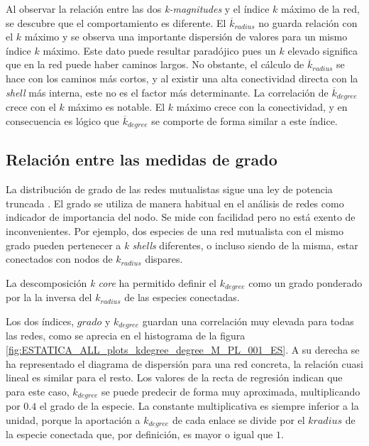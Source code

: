 Al observar la relación entre las dos \textit{k-magnitudes} y el índice $k$ máximo de la red, se descubre que el comportamiento es diferente. El $\overline{k}_{radius}$ no guarda relación con el $k$ máximo y se observa una importante dispersión de valores para un mismo índice $k$ máximo. Este dato puede resultar paradójico pues un $k$ elevado significa que en la red puede haber caminos largos. No obstante, el cálculo de $\overline{k}_{radius}$ se hace con los caminos más cortos, y al existir una alta conectividad directa con la \textit{shell} más interna, este no es el factor más determinante. La correlación de $\overline{k}_{degree}$ crece con el $k$ máximo es notable. El $k$ máximo crece con la conectividad, y en consecuencia es lógico que $\overline{k}_{degree}$ se comporte de forma similar a este índice.

\subsection{Relación entre las medidas de grado}

La distribución de grado de las redes mutualistas sigue una ley de potencia truncada \cite{jordano2003invariant,vazquez2005degree}. El grado se utiliza de manera habitual en el análisis de redes como indicador de importancia del nodo. Se mide con facilidad pero no está exento de inconvenientes. Por ejemplo, dos especies de una red mutualista con el mismo grado pueden pertenecer a \textit{k shells} diferentes, o incluso siendo de la misma, estar conectados con nodos de $k_{radius}$ dispares.

La descomposición \textit{k core} ha permitido definir el $k_{degree}$ como un grado ponderado por la la inversa del $k_{radius}$ de las especies conectadas. 

Los dos índices, $grado$ y ${k}_{degree}$ guardan una correlación muy elevada para todas las redes, como se aprecia en el histograma de la figura \ref{fig:ESTATICA_ALL_plots_kdegree_degree_M_PL_001_ES}. A su derecha se ha representado el diagrama de dispersión para una red concreta, la relación cuasi lineal es similar para el resto. Los valores de la recta de regresión indican que para este caso, $k_{degree}$ se puede predecir de forma muy aproximada, multiplicando por $0.4$ el grado de la especie. La constante multiplicativa es siempre inferior a la unidad, porque la aportación a $k_{degree}$ de cada enlace se divide por el $k{radius}$ de la especie conectada que, por definición, es mayor o igual que $1$. 

